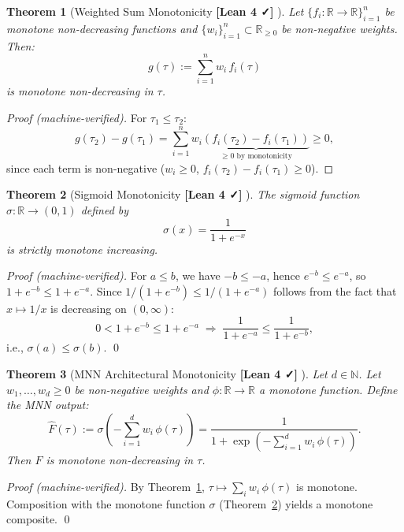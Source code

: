 \documentclass[11pt]{article}
\newtheorem{theorem}{Theorem}[section]
\newcommand{\verified}{%
  \textcolor{green!60!black}{\textbf{[Lean 4 ✓]}}%
}
\newcommand{\R}{\mathbb{R}}
\newcommand{\N}{\mathbb{N}}
\begin{document}
\begin{theorem}[Weighted Sum Monotonicity \verified{}]
\label{thm:weighted-sum}
Let $\{f_i : \R \to \R\}_{i=1}^n$ be monotone non-decreasing functions and
$\{w_i\}_{i=1}^n \subset \R_{\geq 0}$ be non-negative weights. Then:
\[
  g(\tau) := \sum_{i=1}^n w_i\, f_i(\tau)
\]
is monotone non-decreasing in $\tau$.
\end{theorem}

\begin{proof}[Proof (machine-verified)]
For $\tau_1 \leq \tau_2$:
\[
  g(\tau_2) - g(\tau_1)
  = \sum_{i=1}^n w_i \underbrace{(f_i(\tau_2) - f_i(\tau_1))}_{\geq 0\text{ by monotonicity}}
  \geq 0,
\]
since each term is non-negative ($w_i \geq 0$, $f_i(\tau_2) - f_i(\tau_1) \geq 0$).
\end{proof}

\begin{theorem}[Sigmoid Monotonicity \verified{}]
\label{thm:sigmoid}
The sigmoid function $\sigma : \R \to (0,1)$ defined by
\[
  \sigma(x) = \frac{1}{1 + e^{-x}}
\]
is strictly monotone increasing.
\end{theorem}

\begin{proof}[Proof (machine-verified)]
For $a \leq b$, we have $-b \leq -a$, hence $e^{-b} \leq e^{-a}$,
so $1 + e^{-b} \leq 1 + e^{-a}$. Since $1/(1+e^{-b}) \leq 1/(1+e^{-a})$
follows from the fact that $x \mapsto 1/x$ is decreasing on $(0,\infty)$:
\[
  0 < 1 + e^{-b} \leq 1 + e^{-a}
  \;\Rightarrow\;
  \frac{1}{1+e^{-a}} \leq \frac{1}{1+e^{-b}},
\]
i.e., $\sigma(a) \leq \sigma(b)$. \qed
\end{proof}

\begin{theorem}[MNN Architectural Monotonicity \verified{}]
\label{thm:mnn-mono}
Let $d \in \N$. Let $w_1, \ldots, w_d \geq 0$ be non-negative weights and
$\phi : \R \to \R$ a monotone function. Define the MNN output:
\[
  \hat{F}(\tau) := \sigma\!\left(-\sum_{i=1}^d w_i\,\phi(\tau)\right)
               = \frac{1}{1 + \exp\!\left(-\sum_{i=1}^d w_i\,\phi(\tau)\right)}.
\]
Then $\hat{F}$ is monotone non-decreasing in $\tau$.
\end{theorem}

\begin{proof}[Proof (machine-verified)]
By Theorem~\ref{thm:weighted-sum}, $\tau \mapsto \sum_i w_i\,\phi(\tau)$ is monotone.
Composition with the monotone function $\sigma$ (Theorem~\ref{thm:sigmoid})
yields a monotone composite. \qed
\end{proof}
\end{document}
